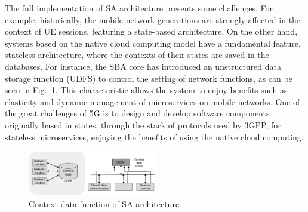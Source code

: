 The full implementation of SA architecture presents some challenges. For example, historically, the mobile network generations are strongly affected in the context of UE sessions, featuring a state-based architecture. On the other hand, systems based on the native cloud computing model have a fundamental feature, stateless architecture, where the contexts of their states are saved in the databases. For instance, the SBA core has introduced an unstructured data storage function (UDFS) to control the setting of network functions, as can be seen in Fig.~\ref{fig:stateless}. This characteristic allows the system to enjoy benefits such as elasticity and dynamic management of microservices on mobile networks. One of the great challenges of 5G is to design and develop software components originally based in states, through the stack of protocols used by 3GPP, for stateless microservices, enjoying the benefits of using the native cloud computing.

\begin{figure}[htb]  
  \begin{center}
 \includegraphics[width=0.5\textwidth]{figs/stateless_eng.pdf}
   \end{center}
 \caption{Context data function of SA architecture.}
 \label{fig:stateless}
 \end{figure}

